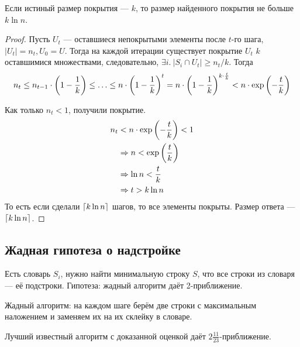 \begin{theorem}
    Если истиный размер покрытия --- $k$,
    то размер найденного покрытия не больше $k \ln n$.
\end{theorem}
\begin{proof}
    Пусть $U_t$ --- оставшиеся непокрытыми элементы после $t$-го шага,
    $|U_t| = n_t, U_0 = U$.
    Тогда на каждой итерации существует покрытие
    $U_t$ $k$ оставшимися множествами, следовательно,
    $\exists i.~|S_i \cap U_t| \ge n_t / k$.
    Тогда
    \[
        n_t
        \le n_{t - 1} \cdot \left( 1 - \frac{1}{k} \right)
        \le \ldots
        \le n \cdot \left( 1 - \frac{1}{k} \right)^t
        = n \cdot \left( 1 - \frac{1}{k} \right)^{k \cdot \frac{t}{k}}
        < n \cdot \exp \left( -\frac{t}{k} \right)
    \]

    Как только $n_t < 1$, получили покрытие.
    \begin{align*}
        n_t & < n \cdot \exp \left( -\frac{t}{k} \right) < 1 \\
        & \Rightarrow n < \exp \left( \frac{t}{k} \right) \\
        & \Rightarrow \ln n < \frac{t}{k} \\
        & \Rightarrow t > k \ln n
    \end{align*}
    То есть если сделали $\left \lceil k \ln n \right \rceil$ шагов,
    то все элементы покрыты.
    Размер ответа --- $\left \lceil k \ln n \right \rceil$.
\end{proof}

\subsection{Жадная гипотеза о надстройке}
Есть словарь $S_i$, нужно найти минимальную строку $S$,
что все строки из словаря --- её подстроки.
Гипотеза: жадный алгоритм даёт 2-приближение.

Жадный алгоритм: на каждом шаге берём две строки
с максимальным наложением и заменяем их на их склейку в словаре.

Лучший известный алгоритм с доказанной оценкой
даёт $2\frac{11}{23}$-приближение.
